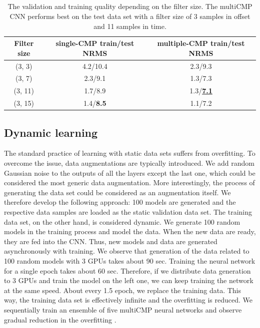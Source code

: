 \documentclass[paper,twocolomn]{geophysics}
\begin{document}
\subsection{}
\begin{table}
    \begin{center}
	\begin{tabular}{||c | c | c ||}
		\hline
		Filter size & single-CMP train/\textbf{test} NRMS & multiple-CMP train/\textbf{test} NRMS \\ \hline\hline
		(3, 3)    & 4.2/10.4                   & 2.3/9.3                  \\ \hline
		(3, 7)    & 2.3/9.1                   & 1.3/7.3                  \\ \hline
		(3, 11)   & 1.7/8.9                   & 1.3/\textbf{\underline{7.1}}        \\ \hline
		(3, 15)   & 1.4/\textbf{8.5}          & 1.1/7.2                  \\ \hline
	\end{tabular}
	\caption{The validation and training quality depending on the filter size. The multiCMP CNN performs best on the test data set with a filter size of 3 samples in offset and 11 samples in time.}
	\end{center}
\end{table}
%

\subsection{Dynamic learning}
The standard practice of learning with static data sets suffers from overfitting. To overcome the issue, data augmentations are typically introduced. We add random Gaussian noise to the outputs of all the layers except the last one, which could be considered the most generic data augmentation. More interestingly, the process of generating the data set could be considered as an augmentation itself. We therefore develop the following approach: 100 models are generated and the respective data samples are loaded as the static validation data set. The training data set, on the other hand, is considered dynamic. We generate 100 random models in the training process and model the data. When the new data are ready, they are fed into the CNN. Thus, new models and data are generated asynchronously with training. We observe that generation of the data related to 100 random models with 3 GPUs takes about 90 sec. Training the neural network for a single epoch takes about 60 sec. Therefore, if we distribute data generation to 3 GPUs and train the model on the left one, we can keep training the network at the same speed. About every 1.5 epoch, we replace the training data. This way, the training data set is effectively infinite and the overfitting is reduced. We sequentially train an ensemble of five multiCMP neural networks and observe gradual reduction in the overfitting .
\end{document}

